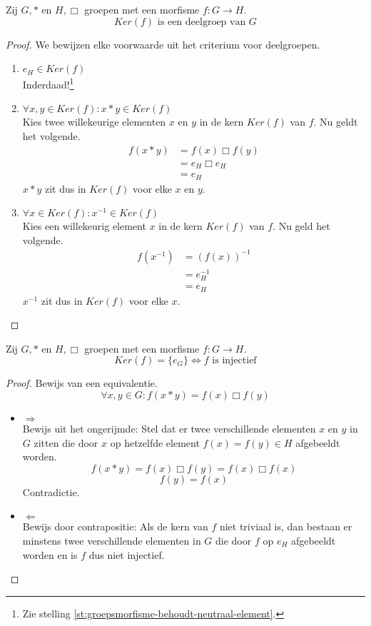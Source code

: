 \documentclass[main.tex]{subfiles}
\begin{document}
\begin{st}
  \label{st:kern-is-deelgroep}
  Zij $G,*$ en $H,\Box$ groepen met een morfisme $f: G \rightarrow H$.
  \[ Ker(f) \text{ is een deelgroep van } G \]
  \begin{proof}
    We bewijzen elke voorwaarde uit het criterium voor deelgroepen.
    \begin{enumerate}
    \item $e_{H} \in Ker(f)$\\
      Inderdaad!\footnote{Zie stelling \ref{st:groepsmorfisme-behoudt-neutraal-element}.}
    \item $\forall x,y \in Ker(f): x * y \in Ker (f)$\\
      Kies twee willekeurige elementen $x$ en $y$ in de kern $Ker(f)$ van $f$.
      Nu geldt het volgende.
      \[
      \begin{array}{rl}
      f(x * y) &= f(x) \Box f(y)\\
               &= e_{H} \Box e_{H}\\
               &= e_{H}
      \end{array}
      \]
      $x * y$ zit dus in $Ker (f)$ voor elke $x$ en $y$.
    \item $\forall x \in Ker(f): x^{-1} \in Ker (f)$\\
      Kies een willekeurig element $x$ in de kern $Ker(f)$ van $f$.
      Nu geld het volgende.
      \[
      \begin{array}{rl}
      f(x^{-1}) &= (f(x))^{-1}\\
               &= e_{H}^{-1}\\
               &= e_{H}
      \end{array}
      \]
      $x^{-1}$ zit dus in $Ker (f)$ voor elke $x$.
    \end{enumerate}
  \end{proof}
\end{st}

\begin{st}
  Zij $G,*$ en $H,\Box$ groepen met een morfisme $f: G \rightarrow H$.
  \[ Ker(f) = \{e_{G}\}\Leftrightarrow f \text{ is injectief} \]

  \begin{proof}
    Bewijs van een equivalentie.
  \[ \forall x,y \in G: f(x*y) = f(x) \Box f(y) \]
    \begin{itemize}
    \item $\Rightarrow$\\
      Bewijs uit het ongerijmde: Stel dat er twee verschillende elementen $x$ en $y$ in $G$ zitten die door $x$ op hetzelfde element $f(x) = f(y) \in H$ afgebeeldt worden.
      \[ f(x*y) = f(x) \Box f(y) = f(x) \Box f(x) \]
      \[ f(y) = f(x) \]
      Contradictie.
    \item $\Leftarrow$\\
      Bewijs door contrapositie: Als de kern van $f$ niet triviaal is, dan bestaan er minstens twee verschillende elementen in $G$ die door $f$ op $e_{H}$ afgebeeldt worden en is $f$ dus niet injectief.
    \end{itemize}
  \end{proof}
\end{st}
\end{document}
